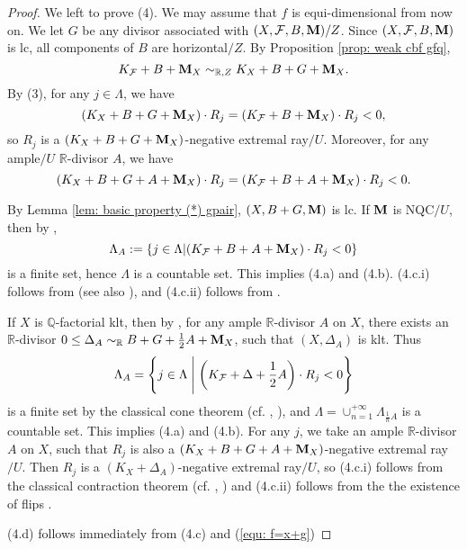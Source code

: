 \documentclass[11pt]{amsart}
\numberwithin{equation}{section}
\newcommand{\Mm}{{\bf{M}}}
\newcommand{\Qq}{\mathbb{Q}}
\newcommand{\Rr}{\mathbb{R}}
\newcommand{\Ff}{\mathcal{F}}
\theoremstyle{definition}
\theoremstyle{definition}
\theoremstyle{definition}
\begin{document}
\begin{proof}
We left to prove (4). We may assume that $f$ is equi-dimensional from now on. We let $G$ be any divisor associated with $(X,\Ff,B,\Mm)/Z$. Since $(X,\Ff,B,\Mm)$ is lc, all components of $B$ are horizontal$/Z$. By Proposition \ref{prop: weak cbf gfq}, 
\begin{equation}\label{equ: f=x+g}
    K_{\Ff}+B+\Mm_X\sim_{\mathbb R,Z}K_{X}+B+G+\Mm_X.
\end{equation}
By (3), for any $j\in\Lambda$, we have
$$(K_{X}+B+G+\Mm_X)\cdot R_j=(K_{\Ff}+B+\Mm_X)\cdot R_j<0,$$
so $R_j$ is a $(K_{X}+B+G+\Mm_X)$-negative extremal ray$/U$. Moreover, for any ample$/U$ $\Rr$-divisor $A$, we have
$$(K_{X}+B+G+A+\Mm_X)\cdot R_j=(K_{\Ff}+B+A+\Mm_X)\cdot R_j<0.$$

By Lemma \ref{lem: basic property (*) gpair}, $(X,B+G,\Mm)$ is lc. If $\Mm$ is NQC$/U$, then by \cite[Theorem 1.3(3)]{HL21a},
$$\Lambda_A:=\{j\in\Lambda|(K_{\Ff}+B+A+\Mm_X)\cdot R_j<0\}$$
is a finite set, hence $\Lambda$ is a countable set. This implies (4.a) and (4.b). (4.c.i) follows from \cite[Theorem 1.5]{Xie22} (see also \cite[Theorem 1.7]{CLX23}), and (4.c.ii) follows from \cite[Theorem 1.2]{LX23b}. 

If $X$ is $\Qq$-factorial klt, then by \cite[Lemma 3.4]{HL22}, for any ample $\Rr$-divisor $A$ on $X$, there exists an $\Rr$-divisor $0\leq\Delta_A\sim_{\mathbb R}B+G+\frac{1}{2}A+\Mm_X$, such that $(X,\Delta_A)$ is klt. Thus
$$\Lambda_A=\left\{j\in\Lambda\Biggm|\left(K_{\Ff}+\Delta+\frac{1}{2}A\right)\cdot R_j<0\right\}$$
is a finite set by the classical cone theorem (cf. \cite[Theorem 4-2-1]{KMM87}, \cite[Theorem 4.5.2]{Fuj17}), and $\Lambda=\cup_{n=1}^{+\infty}\Lambda_{\frac{1}{n}A}$ is a countable set. This implies (4.a) and (4.b). For any $j$, we take an ample $\Rr$-divisor $A$ on $X$, such that $R_j$ is also a $(K_{X}+B+G+A+\Mm_X)$-negative extremal ray$/U$. Then $R_j$ is a $(K_X+\Delta_A)$-negative extremal ray$/U$, so (4.c.i) follows from the classical contraction theorem (cf. \cite[Theorem 3-2-1]{KMM87}, \cite[Theorem 4.5.2]{Fuj17}) and (4.c.ii) follows from the the existence of flips \cite[Corollary 1.4.1]{BCHM10}.

(4.d) follows immediately from (4.c) and (\ref{equ: f=x+g})
\end{proof}
\end{document}

